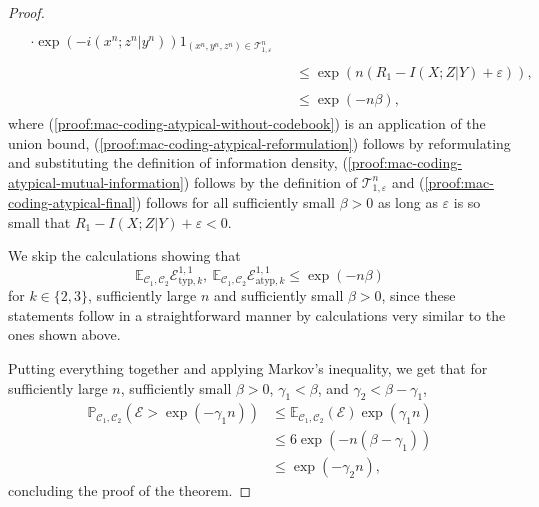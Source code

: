 \documentclass[journal]{IEEEtran}
\newcommand{\codebookRateOne}{R_1}
\newcommand{\channelInOne}{X}
\newcommand{\channelInOneAlphElement}{x}
\newcommand{\channelInTwo}{Y}
\newcommand{\channelInTwoAlphElement}{y}
\newcommand{\channelOut}{Z}
\newcommand{\channelOutAlphElement}{z}
\newcommand{\codebookOne}{\mathcal{C}_1}
\newcommand{\codebookTwo}{\mathcal{C}_2}
\newcommand{\codebookBlocklength}{n}
\newcommand{\mutualInformationConditional}[3]{I(#1;#2|#3)}
\newcommand{\finalconstOne}{\gamma_1}
\newcommand{\finalconstTwo}{\gamma_2}
\newcommand{\proofconstantOne}{{\beta}}
\newcommand{\informationDensityConditional}[3]{i({#1};{#2} | {#3})}
\newcommand{\Expectation}{\mathbb{E}}
\newcommand{\Probability}{\mathbb{P}}
\newcommand{\indicator}[1]{1_{#1}}
\newcommand{\typicalityParam}{\varepsilon}
\newcommand{\typicalSetIndex}[3]{\mathcal{T}_{#3,#1}^{#2}}
\newcommand{\errorprob}{\mathcal{E}}
\newcommand{\indexForTypicalSet}{k}
\begin{document}
\begin{proof}
\begin{align}
\begin{aligned}
\\
&\cdot \exp(-\informationDensityConditional{\channelInOneAlphElement^\codebookBlocklength}{\channelOutAlphElement^\codebookBlocklength}{\channelInTwoAlphElement^\codebookBlocklength})
\indicator{(\channelInOneAlphElement^\codebookBlocklength,\channelInTwoAlphElement^\codebookBlocklength,\channelOutAlphElement^\codebookBlocklength)
           \in
           \typicalSetIndex{\typicalityParam}{\codebookBlocklength}{1}
          }
\end{aligned}
\\
\label{proof:mac-coding-atypical-mutual-information}
&\begin{aligned}
\leq
\exp(\codebookBlocklength(\codebookRateOne - \mutualInformationConditional{\channelInOne}{\channelOut}{\channelInTwo} + \typicalityParam)),
\end{aligned}
\\
\label{proof:mac-coding-atypical-final}
&\begin{aligned}
\leq
\exp(-\codebookBlocklength\proofconstantOne),
\end{aligned}
\end{align}
where (\ref{proof:mac-coding-atypical-without-codebook}) is an application of the union bound, (\ref{proof:mac-coding-atypical-reformulation}) follows by reformulating and substituting the definition of information density, (\ref{proof:mac-coding-atypical-mutual-information}) follows by the definition of $\typicalSetIndex{\typicalityParam}{\codebookBlocklength}{1}$ and (\ref{proof:mac-coding-atypical-final}) follows for all sufficiently small $\proofconstantOne > 0$ as long as $\typicalityParam$ is so small that $\codebookRateOne - \mutualInformationConditional{\channelInOne}{\channelOut}{\channelInTwo} + \typicalityParam < 0$.

We skip the calculations showing that
\[\Expectation_{\codebookOne, \codebookTwo} \errorprob_{\mathrm{typ},\indexForTypicalSet}^{1,1},~ \Expectation_{\codebookOne, \codebookTwo} \errorprob_{\mathrm{atyp},\indexForTypicalSet}^{1,1} \leq \exp(-\codebookBlocklength\proofconstantOne)\]
for $\indexForTypicalSet \in \{2,3\}$, sufficiently large $\codebookBlocklength$ and sufficiently small $\proofconstantOne > 0$, since these statements follow in a straightforward manner by calculations very similar to the ones shown above.

Putting everything together and applying Markov's inequality, we get that for sufficiently large $\codebookBlocklength$, sufficiently small $\proofconstantOne > 0$, $\finalconstOne < \proofconstantOne$, and $\finalconstTwo < \proofconstantOne - \finalconstOne$,
\begin{align*}
\Probability_{\codebookOne, \codebookTwo} \left(
  \errorprob
  >
  \exp(-\finalconstOne\codebookBlocklength)
\right)
&\leq
\Expectation_{\codebookOne, \codebookTwo} (\errorprob)
\exp(\finalconstOne\codebookBlocklength)
\\
&\leq
6 \exp(-\codebookBlocklength(\proofconstantOne - \finalconstOne))
\\
&\leq
\exp(-\finalconstTwo\codebookBlocklength),
\end{align*}
concluding the proof of the theorem.
\end{proof}
\end{document}
